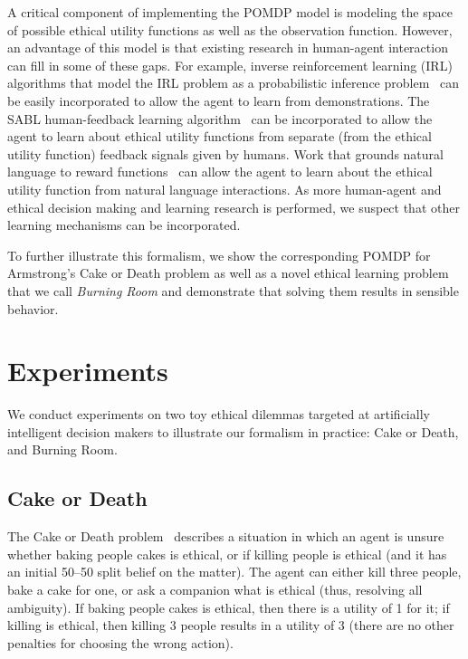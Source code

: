 \documentclass[11pt]{article}
\begin{document}
A critical component of implementing the POMDP model is modeling the space of possible ethical utility functions as well as the observation function. However, an advantage of this model is that existing research in human-agent interaction can fill in some of these gaps. For example, inverse reinforcement learning (IRL) algorithms that model the IRL problem as a probabilistic inference problem~\cite{ramachandran2007bayesian,ziebart2008maximum,babes2011apprenticeship,macglashan2015between} can be easily incorporated to allow the agent to learn from demonstrations. The SABL human-feedback learning algorithm~\cite{loftin2014strategy} can be incorporated to allow the agent to learn about ethical utility functions from separate (from the ethical utility function) feedback signals given by humans. Work that grounds natural language to reward functions~\cite{macglashanGrounding2015} can allow the agent to learn about the ethical utility function from natural language interactions. As more human-agent and ethical decision making and learning research is performed, we suspect that other learning mechanisms can be incorporated.

To further illustrate this formalism, we show the corresponding POMDP for Armstrong's Cake or Death problem as well as a novel ethical learning problem that we call {\em Burning Room} and demonstrate that solving them results in sensible behavior.



\section{Experiments}

We conduct experiments on two toy ethical dilemmas targeted at artificially intelligent decision makers to illustrate our formalism in practice: Cake or Death, and Burning Room.

\subsection{Cake or Death}
The Cake or Death problem~\cite{AAAIW1510183} describes a situation in which an agent is unsure whether baking people cakes is ethical, or if killing people is ethical (and it has an initial 50--50 split belief on the matter). The agent can either kill three people, bake a cake for one, or ask a companion what is ethical (thus, resolving all ambiguity). If baking people cakes is ethical, then there is a utility of 1 for it; if killing is ethical, then killing 3 people results in a utility of 3 (there are no other penalties for choosing the wrong action).
\end{document}
